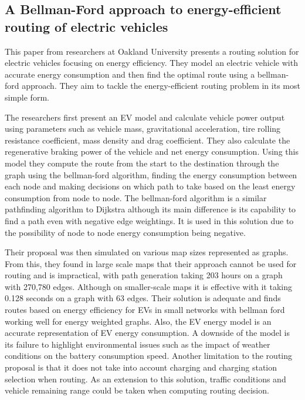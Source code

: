 \documentclass[11pt]{report}
\begin{document}
\subsection{A Bellman-Ford approach to energy-efficient routing of electric vehicles \autocite{bellmanFordRouting}}

This paper from researchers at Oakland University presents a routing solution for electric vehicles focusing on energy efficiency. They model an electric vehicle with accurate energy consumption and then find the optimal route using a bellman-ford approach. They aim to tackle the energy-efficient routing problem in its most simple form.

The researchers first present an EV model and calculate vehicle power output using parameters such as vehicle mass, gravitational acceleration, tire rolling resistance coefficient, mass density and drag coefficient. They also calculate the regenerative braking power of the vehicle and net energy consumption. Using this model they compute the route from the start to the destination through the graph using the bellman-ford algorithm, finding the energy consumption between each node and making decisions on which path to take based on the least energy consumption from node to node. The bellman-ford algorithm \autocite{bellman1958routing} is a similar pathfinding algorithm to Dijkstra although its main difference is its capability to find a path even with negative edge weightings. It is used in this solution due to the possibility of node to node energy consumption being negative.

Their proposal was then simulated on various map sizes represented as graphs. From this, they found in large scale maps that their approach cannot be used for routing and is impractical, with path generation taking 203 hours on a graph with 270,780 edges. Although on smaller-scale maps it is effective with it taking 0.128 seconds on a graph with 63 edges. Their solution is adequate and finds routes based on energy efficiency for EVs in small networks with bellman ford working well for energy weighted graphs. Also, the EV energy model is an accurate representation of EV energy consumption. A downside of the model is its failure to highlight environmental issues such as the impact of weather conditions on the battery consumption speed. Another limitation to the routing proposal is that it does not take into account charging and charging station selection when routing. As an extension to this solution, traffic conditions and vehicle remaining range could be taken when computing routing decision. 
\end{document}
